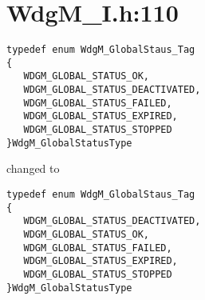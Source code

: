 \documentclass[11pt,a4paper]{article}
\begin{document}
\newpage
\section{WdgM\_I.h:110}
\begin{lstlisting}
typedef enum WdgM_GlobalStaus_Tag
{
   WDGM_GLOBAL_STATUS_OK,
   WDGM_GLOBAL_STATUS_DEACTIVATED,
   WDGM_GLOBAL_STATUS_FAILED,
   WDGM_GLOBAL_STATUS_EXPIRED,
   WDGM_GLOBAL_STATUS_STOPPED
}WdgM_GlobalStatusType
\end{lstlisting}
changed to
\begin{lstlisting}
typedef enum WdgM_GlobalStaus_Tag
{
   WDGM_GLOBAL_STATUS_DEACTIVATED,
   WDGM_GLOBAL_STATUS_OK,
   WDGM_GLOBAL_STATUS_FAILED,
   WDGM_GLOBAL_STATUS_EXPIRED,
   WDGM_GLOBAL_STATUS_STOPPED
}WdgM_GlobalStatusType
\end{lstlisting}
\end{document}
